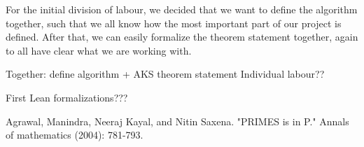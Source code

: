 \documentclass[10pt,a4paper]{article}
\newcommand{\0}{\textbf{0}}
\begin{document}
	For the initial division of labour, we decided that we want to define the algorithm together, such that we all know how the most important part of our project is defined.
	After that, we can easily formalize the theorem statement together, again to all have clear what we are working with.
	
	Together: define algorithm + AKS theorem statement
	Individual labour??
	
	First Lean formalizations???

	\begin{thebibliography}{0}
		Agrawal, Manindra, Neeraj Kayal, and Nitin Saxena. "PRIMES is in P." Annals of mathematics (2004): 781-793.
	\end{thebibliography}
\end{document}
